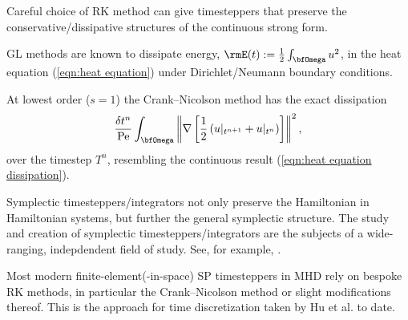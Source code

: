     Careful choice of RK method can give timesteppers that preserve the conservative/dissipative structures of the continuous strong form.

    \line
    
    \begin{example}
        GL methods are known to dissipate energy, $\rmE(t)  :=  \frac{1}{2}\int_{\bfOmega}u^{2}$, in the heat equation (\ref{eqn:heat equation}) under Dirichlet/Neumann boundary conditions.
        
        At lowest order ($s  =  1$) the Crank--Nicolson method has the exact dissipation
        \begin{equation}\label{eqn:heat equation dissipation implicit midpoint}
            \frac{\delta t^{n}}{\rmPe}\int_{\bfOmega}\left\|\nabla\left[\frac{1}{2}\left(u|_{t^{n + 1}} + u|_{t^{n}}\right)\right]\right\|^{2},
        \end{equation}
        over the timestep $T^{n}$, resembling the continuous result (\ref{eqn:heat equation dissipation}).
    \end{example}
    
    \begin{example}
        Symplectic timesteppers/integrators not only preserve the Hamiltonian in Hamiltonian systems, but further the general symplectic structure. The study and creation of symplectic timesteppers/integrators are the subjects of a wide-ranging, indepdendent field of study. See, for example, \cite{Hairer_Lubich_Wanner_2006}.
    \end{example}
    
    \line

    Most modern finite-element(-in-space) SP timesteppers in MHD rely on bespoke RK methods, in particular the Crank--Nicolson method or slight modifications thereof. This is the approach for time discretization taken by Hu et al. to date. \cite{Hu_Lee_Xu_2021, Laakmann_Hu_Farrell_2022}
    